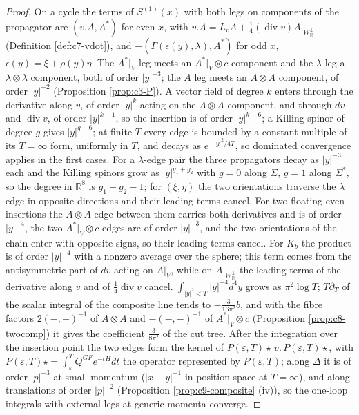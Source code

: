 \begin{proof}
On a cycle the terms of $S^{(1)}(x)$ with both legs on components of the propagator are $(v.A,A^*)$ for even $x$, with $v.A=L_vA+\tfrac14(\operatorname{div}v)A|_{W_{\mathbb R}^\perp}$ (Definition \ref{def:c7-vdot}), and $-(\Gamma(\epsilon(y),\lambda),A^*)$ for odd $x$, $\epsilon(y)=\xi+\rho(y)\eta$. The $A^*|_V$ leg meets an $A^*|_V\otimes c$ component and the $\lambda$ leg a $\lambda\otimes\lambda$ component, both of order $|y|^{-3}$; the $A$ leg meets an $A\otimes A$ component, of order $|y|^{-2}$ (Proposition \ref{prop:c3-P}). A vector field of degree $k$ enters through the derivative along $v$, of order $|y|^k$ acting on the $A\otimes A$ component, and through $dv$ and $\operatorname{div}v$, of order $|y|^{k-1}$, so the insertion is of order $|y|^{k-6}$; a Killing spinor of degree $g$ gives $|y|^{g-6}$; at finite $T$ every edge is bounded by a constant multiple of its $T=\infty$ form, uniformly in $T$, and decays as $e^{-|y|^2/4T}$, so dominated convergence applies in the first cases. For a $\lambda$-edge pair the three propagators decay as $|y|^{-3}$ each and the Killing spinors grow as $|y|^{g_1+g_2}$ with $g=0$ along $\Sigma$, $g=1$ along $\Sigma^*$, so the degree in $\mathbb R^8$ is $g_1+g_2-1$; for $(\xi,\eta)$ the two orientations traverse the $\lambda$ edge in opposite directions and their leading terms cancel. For two floating even insertions the $A\otimes A$ edge between them carries both derivatives and is of order $|y|^{-4}$, the two $A^*|_V\otimes c$ edges are of order $|y|^{-3}$, and the two orientations of the chain enter with opposite signs, so their leading terms cancel. For $K_b$ the product is of order $|y|^{-4}$ with a nonzero average over the sphere; this term comes from the antisymmetric part of $dv$ acting on $A|_V$, while on $A|_{W_{\mathbb R}^\perp}$ the leading terms of the derivative along $v$ and of $\tfrac14\operatorname{div}v$ cancel. $\int_{|y|^2<T}|y|^{-4}d^4y$ grows as $\pi^2\log T$; $T\partial_T$ of the scalar integral of the composite line tends to $-\tfrac{3}{16\pi^2}b$, and with the fibre factors $2(-,-)^{-1}$ of $A\otimes A$ and $-(-,-)^{-1}$ of $A^*|_V\otimes c$ (Proposition \ref{prop:c8-twocomp}) it gives the coefficient $\tfrac{3}{8\pi^2}$ of the cut tree. After the integration over the insertion point the two edges form the kernel of $P(\varepsilon,T)\star\,v.\,P(\varepsilon,T)\star$, with $P(\varepsilon,T)\star=\int_\varepsilon^TQ^{GF}e^{-tH}dt$ the operator represented by $P(\varepsilon,T)$; along $\Delta$ it is of order $|p|^{-3}$ at small momentum ($|x-y|^{-1}$ in position space at $T=\infty$), and along translations of order $|p|^{-2}$ (Proposition \ref{prop:c9-composite} (iv)), so the one-loop integrals with external legs at generic momenta converge.
\end{proof}

